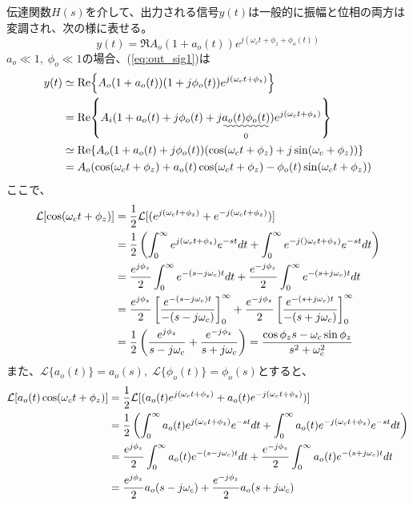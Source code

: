 \documentclass[book]{jlreq}
\begin{document}
伝達関数$H(s)$を介して、出力される信号$y(t)$は一般的に振幅と位相の両方は変調され、次の様に表せる。
%
\begin{equation}
    y(t) = \Re{A_o(1+a_o(t))e^{j(\omega_c t+\phi_z + \phi_o(t))}}
    \label{eq:out_sig1}
\end{equation}
%
$a_o \ll 1,\; \phi_o \ll 1$の場合、(\ref{eq:out_sig1})は
%
\begin{align}
    y(t) & \simeq \Re{A_o(1+a_o(t))(1 + j\phi_o(t))e^{j(\omega_c t+\phi_z)}}\notag                                     \\
         & = \Re{A_i(1 + a_o(t) + j\phi_o(t) + j\underset{0}{\uwave{a_o(t)\phi_o(t)}})e^{j(\omega_c t+\phi_z)}} \notag \\
         & \simeq \Re{A_o(1+a_o(t)+j\phi_o(t))(\cos(\omega_c t + \phi_z)+j\sin(\omega_c + \phi_z))}\notag              \\
         & = A_o(\cos(\omega_c t+\phi_z)+a_o(t)\cos(\omega_c t+\phi_z) - \phi_o(t)\sin(\omega_c t + \phi_z))
    \label{eq:out_sig2}
\end{align}
%
ここで、
%
\begin{align}
    \mathcal{L} [\cos(\omega_c t + \phi_z)]
     & = \frac{1}{2}\mathcal{L}[(e^{j(\omega_c t+\phi_z)}+e^{-j(\omega_c t+\phi_z)})]\notag                                             \\
     & = \frac{1}{2}\left(\int_0^\infty e^{j(\omega_c t+\phi_z)} e^{-st} dt
    + \int_0^\infty e^{-j()\omega_c t+\phi_z)} e^{-st} dt \right)\notag                                                                 \\
     & = \frac{e^{j\phi_z}}{2}\int_0^\infty e^{-(s-j\omega_c) t} dt + \frac{e^{-j\phi_z}}{2}\int_0^\infty e^{-(s+j\omega_c) t} dt\notag \\
     & = \frac{e^{j\phi_z}}{2}\left[\frac{e^{-(s-j\omega_c) t}}{-(s-j\omega_c)}\right]_0^\infty
    +\frac{e^{-j\phi_z}}{2}\left[\frac{e^{-(s+j\omega_c) t}}{-(s+j\omega_c)}\right]_0^\infty\notag                                      \\
     & = \frac{1}{2}\left( \frac{e^{j\phi_z}}{s-j\omega_c}+\frac{e^{-j\phi_z}}{s+j\omega_c}\right)
    = \frac{\cos\phi_z s - \omega_c\sin\phi_z}{s^2+\omega_c^2}
\end{align}
%
また、$\mathcal{L}\{a_o(t)\} = a_o(s),\; \mathcal{L}\{\phi_o(t)\} = \phi_o(s)$とすると、
%
\begin{align}
    \mathcal{L} [a_o(t)\cos(\omega_c t+\phi_z)]
     & = \frac{1}{2}\mathcal{L}[(a_o(t) e^{j(\omega_c t+\phi_z)}+a_o(t) e^{-j(\omega_c t+\phi_z)})]\notag \\
     & = \frac{1}{2}\left(\int_0^\infty a_o(t) e^{j(\omega_c t+\phi_z)} e^{-st} dt
    + \int_0^\infty a_o(t) e^{-j(\omega_c t+\phi_z)} e^{-st} dt \right)\notag                             \\
     & = \frac{e^{j\phi_z}}{2}\int_0^\infty a_o(t) e^{-(s-j\omega_c) t} dt
    + \frac{e^{-j\phi_z}}{2}\int_0^\infty a_o(t) e^{-(s+j\omega_c) t} dt\notag                            \\
     & = \frac{e^{j\phi_z}}{2}a_o(s-j\omega_c) + \frac{e^{-j\phi_z}}{2} a_o(s+j\omega_c)
\end{align}
\end{document}
